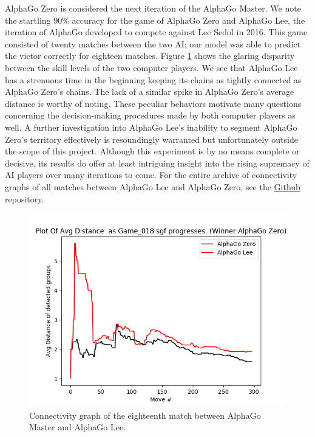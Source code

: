 \documentclass[11pt]{article}
\begin{document}
AlphaGo Zero is considered the next iteration of the AlphaGo Master. We note the startling 90\% accuracy for the game of AlphaGo Zero and AlphaGo Lee, the iteration of AlphaGo developed to compete against Lee Sedol in 2016. This game consisted of twenty matches between the two AI; our model was able to predict the victor correctly for eighteen matches. Figure \ref{fig:alphaconn1} shows the glaring disparity between the skill levels of the two computer players. We see that AlphaGo Lee has a strenuous time in the beginning keeping its chains as tightly connected as AlphaGo Zero's chains. The lack of a similar spike in AlphaGo Zero's average distance is worthy of noting. These peculiar behaviors motivate many questions concerning the decision-making procedures made by both computer players as well. A further investigation into AlphaGo Lee's inability to segment AlphaGo Zero's territory effectively is resoundingly warranted but unfortunately outside the scope of this project. Although this experiment is by no means complete or decisive, its results do offer at least intriguing insight into the rising supremacy of AI players over many iterations to come. For the entire archive of connectivity graphs of all matches between AlphaGo Lee and AlphaGo Zero, see the \href{https://github.com/ekim1919/TDAGo/tree/master/results/agzero_vs_aglee}{Github} repository.

\begin{figure}[ht]
  \centering
  \includegraphics[scale=0.5]{alphaconn1.png}
  \caption{Connectivity graph of the eighteenth match between AlphaGo Master and AlphaGo Lee.}
  \label{fig:alphaconn1}
\end{figure}
\end{document}
